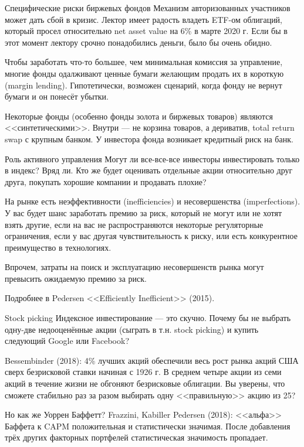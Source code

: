 \documentclass{beamer}
\begin{document}
\begin{frame}{Специфические риски биржевых фондов}
\justify
Механизм авторизованных участников может дать сбой в кризис. Лектор имеет радость владеть ETF-ом облигаций, который просел относительно net asset value на 6\% в марте 2020 г. Если бы в этот момент лектору срочно понадобились деньги, было бы очень обидно.

\justify
Чтобы заработать что-то большее, чем минимальная комиссия за управление, многие фонды одалживают ценные бумаги желающим продать их в короткую (margin lending). Гипотетически, возможен сценарий, когда фонду не вернут бумаги и он понесёт убытки.

\justify
Некоторые фонды (особенно фонды золота и биржевых товаров) являются <<синтетическими>>. Внутри --- не корзина товаров, а дериватив, total return swap с крупным банком. У инвестора фонда возникает кредитный риск на банк.
\end{frame}



\begin{frame}{Роль активного управления}
\justify
Могут ли все-все-все инвесторы инвестировать только в индекс? Вряд ли. Кто же будет оценивать отдельные акции относительно друг друга, покупать хорошие компании и продавать плохие?

\justify
На рынке есть неэффективности (inefficiencies) и несовершенства (imperfections). У вас будет шанс заработать премию за риск, который не могут или не хотят взять другие, если на вас не распространяются некоторые регуляторные ограничения, если у вас другая чувствительность к риску, или есть конкурентное преимущество в технологиях.

\justify
Впрочем, затраты на поиск и эксплуатацию несовершенств рынка могут превысить ожидаемую премию за риск.

\justify
Подробнее в Pedersen <<Efficiently Inefficient>> (2015).
\end{frame}



\begin{frame}{Stock picking}
\justify
Индексное инвестирование --- это скучно. Почему бы не выбрать одну-две недооценённые акции (сыграть в т.н. stock picking) и купить следующий Google или Facebook?

\justify
Bessembinder (2018): 4\% лучших акций обеспечили весь рост рынка акций США сверх безрисковой ставки начиная с 1926 г. В среднем четыре акции из семи акций в течение жизни не обгоняют безрисковые облигации. Вы уверены, что сможете стабильно раз за разом выбирать одну <<правильную>> акцию из 25?

\justify
Но как же Уоррен Баффетт? Frazzini, Kabiller Pedersen (2018): <<альфа>> Баффета к CAPM положительная и статистически значимая. После добавления трёх других факторных портфелей статистическая значимость пропадает.
\end{frame}
\end{document}

